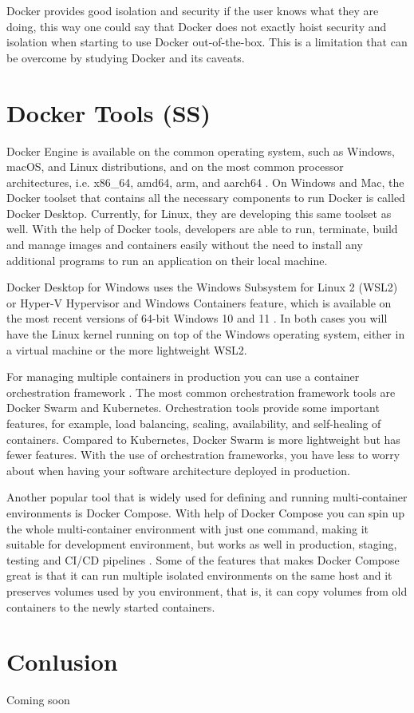 \documentclass[fleqn,12pt]{olplainarticle}
\begin{document}
Docker provides good isolation and security if the user knows what they are doing, this way one could say that Docker does not exactly hoist security and isolation when starting to use Docker out-of-the-box. This is a limitation that can be overcome by studying Docker and its caveats.

\section{Docker Tools (SS)}

Docker Engine is available on the common operating system, such as Windows, macOS, and Linux distributions, and on the most common processor architectures, i.e. x86\_64, amd64, arm, and aarch64 \citep{docker:install}.  On Windows and Mac, the Docker toolset that contains all the necessary components to run Docker is called Docker Desktop. Currently, for Linux, they are developing this same toolset as well. With the help of Docker tools, developers are able to run, terminate, build and manage images and containers easily without the need to install any additional programs to run an application on their local machine.

Docker Desktop for Windows uses the Windows Subsystem for Linux 2 (WSL2) or Hyper-V Hypervisor and Windows Containers feature, which is available on the most recent versions of 64-bit Windows 10 and 11 \citep{docker:windows}. In both cases you will have the Linux kernel running on top of the Windows operating system, either in a virtual machine or the more lightweight WSL2. 

For managing multiple containers in production you can use a container orchestration framework \citep{circleci:swarm_kubernetes}. The most common orchestration framework tools are Docker Swarm and Kubernetes. Orchestration tools provide some important features, for example, load balancing, scaling, availability, and self-healing of containers. Compared to Kubernetes, Docker Swarm is more lightweight but has fewer features. With the use of orchestration frameworks, you have less to worry about when having your software architecture deployed in production.

Another popular tool that is widely used for defining and running multi-container environments is Docker Compose. With help of Docker Compose you can spin up the whole multi-container environment with just one command, making it suitable for development environment, but works as well in production, staging, testing and CI/CD pipelines \citep{docker:compose-overview}. Some of the features that makes Docker Compose great is that it can run multiple isolated environments on the same host and it preserves volumes used by you environment, that is, it can copy volumes from old containers to the newly started containers.

\section{Conlusion}
Coming soon

\end{document}
